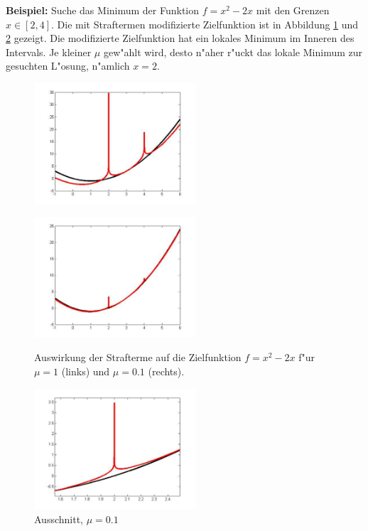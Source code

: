 \begin{refsection}
{\parindent 0pt \bf Beispiel:} Suche das Minimum der Funktion $f=x^2-2x$ mit den
Grenzen $x\in[2,4]$. Die mit Straftermen modifizierte Zielfunktion ist
in Abbildung \ref{innerepunkte:strafterme} und \ref{innerpunkte:strafterme2}
gezeigt.
Die modifizierte Zielfunktion hat ein lokales Minimum im Inneren
des Intervals.
Je kleiner $\mu$ gew"ahlt wird, desto n"aher r"uckt
das lokale Minimum  zur gesuchten L"osung, n"amlich $x=2$.

\begin{figure}
\begin{minipage}[t]{6.0cm}
\includegraphics[width=6.0cm]{./innerepunkte/ln-barrieren-u=1.pdf}\\
	\end{minipage}
	\hspace{0.1cm}
	\begin{minipage}[t]{6.0cm}	
\includegraphics[width=6.0cm]{./innerepunkte/ln-barrieren-u=0_1-1.pdf}\\
	\end{minipage}
	\hspace{0.1cm}
	\begin{minipage}[t]{6.0cm}	
\end{minipage}
\caption{Auswirkung der Strafterme auf die Zielfunktion $f=x^2-2x$
f"ur $\mu=1$ (links) und $\mu=0.1$ (rechts).
\label{innerepunkte:strafterme}}
\end{figure}

\begin{figure}
\begin{center}
\includegraphics[width=6.0cm]{./innerepunkte/ln-barrieren-u=0_1-2.pdf}
\end{center}
\caption{Ausschnitt, $\mu=0.1$\label{innerpunkte:strafterme2}}
\end{figure}


\end{refsection}
